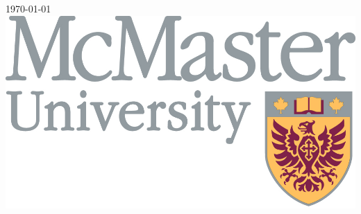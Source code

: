 \documentclass{aimsessay}
\theoremstyle{plain}
\theoremstyle{definition}
\begin{document}
\begin{titlepage}


{\large \today}\\[2cm] %


\includegraphics{McMasterfull_colour.jpg}\\[1cm] %



\end{titlepage}



\pagestyle{myheadings}




\newpage


\newpage


\newpage
\renewcommand{\bibname}{References}
\nocite{*}





\end{document}
